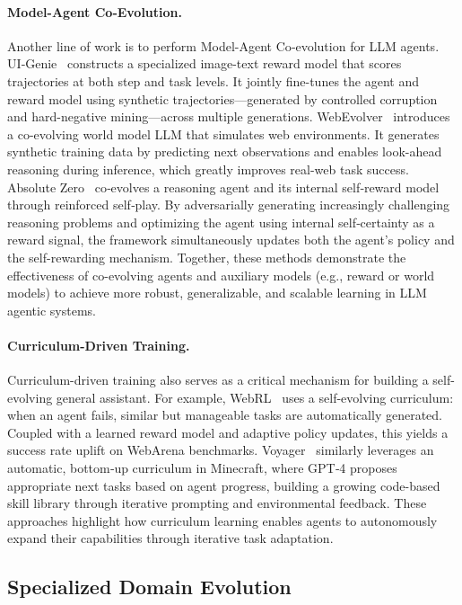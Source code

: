 \documentclass[10pt]{article} %
\begin{document}
\paragraph{Model-Agent Co‑Evolution.} Another line of work is to perform Model-Agent Co‑evolution for LLM agents. 
UI‑Genie~\citep{xiao2025ui} constructs a specialized image-text reward model that scores trajectories at both step and task levels. It jointly fine-tunes the agent and reward model using synthetic trajectories—generated by controlled corruption and hard-negative mining—across multiple generations.
WebEvolver~\citep{fang2025webevolver} introduces a co-evolving world model LLM that simulates web environments. It generates synthetic training data by predicting next observations and enables look-ahead reasoning during inference, which greatly improves real-web task success. 
Absolute Zero~\citep{zhao2025absolute} co‑evolves a reasoning agent and its internal self‑reward model through reinforced self‑play. By adversarially generating increasingly challenging reasoning problems and optimizing the agent using internal self‑certainty as a reward signal, the framework simultaneously updates both the agent's policy and the self-rewarding mechanism.
Together, these methods demonstrate the effectiveness of co-evolving agents and auxiliary models (e.g., reward or world models) to achieve more robust, generalizable, and scalable learning in LLM agentic systems.

\paragraph{Curriculum-Driven Training.} 
Curriculum-driven training also serves as a critical mechanism for building a self-evolving general assistant. 
For example, WebRL~\citep{qi2024webrl} uses a self-evolving curriculum: when an agent fails, similar but manageable tasks are automatically generated. Coupled with a learned reward model and adaptive policy updates, this yields a success rate uplift on WebArena benchmarks. 
Voyager~\citep{wang2023voyager} similarly leverages an automatic, bottom‑up curriculum in Minecraft, where GPT‑4 proposes appropriate next tasks based on agent progress, building a growing code-based skill library through iterative prompting and environmental feedback. 
These approaches highlight how curriculum learning enables agents to autonomously expand their capabilities through iterative task adaptation.


\subsection{Specialized Domain Evolution}
\end{document}
